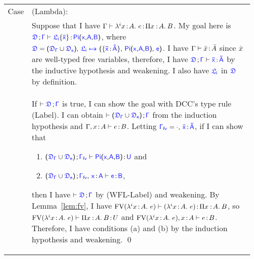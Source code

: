 \begin{theorem}
\begin{longtable}{p{0.05\linewidth} p{0.95\linewidth}}
Case & (Lambda):\\
& Suppose that I have $\Gamma \vdash \lambda^{i}x\hspace{0.5mm}{:}\hspace{0.5mm} A.\ e \hspace{0.5mm}{:}\hspace{0.5mm} \Pi x\mkern1.5mu{\hspace{0.5mm}{:}\hspace{0.5mm}} A.\hspace{0.8mm}B$.
My goal here is $\targetcon \vdash \targetlab{\flabel_i}{\bar{x}} \goodcolon \targetpi{x}{A}{B}$, where 
$\target{\fdef} = \sfpl \target{\fdef_{\Gamma}} \cup \target{\fdef_e}\sfpr \sfcomma 
\itemdef{\target{\flabel_i}}{\itemtype{\bar{x}}{\bar{A}}}{\targetpi{x}{A}{B}}{\target{e}}$. I have
$\Gamma \vdash \bar{x} \hspace{0.5mm}{:}\hspace{0.5mm} \bar{A}$ since $\bar{x}$ are well-typed free variables, therefore, I have 
$\targetcon \vdash \itemtype{\bar{x}}{\bar{A}}$ by the inductive hypothesis and weakening. I also have $\target{\flabel_i}$ in $\target{\fdef}$ by definition.\\
& If $\vdash \targetcon$ is true, I can show the goal with DCC's type rule (Label). I can obtain $\vdash \sfpl \target{\fdef_{\Gamma}} \cup \target{\fdef_e}\sfpr \semicolon \target{\Gamma}$ from the induction hypothesis and $\Gamma, x \hspace{0.5mm}{:}\hspace{0.5mm} A \vdash e \hspace{0.5mm}{:}\hspace{0.5mm} B$. Letting 
$\target{\Gamma_{fv}} = \target{\cdot}\sfcomma\itemtype{\bar{x}}{\bar{A}}$, if I can show that 
\begin{enumerate}[label=(\alph*)]
\item $\sfpl \target{\fdef_{\Gamma}} \cup \target{\fdef_e}\sfpr \semicolon \target{\Gamma_{fv}} \vdash \targetpi{x}{A}{B} \goodcolon \target{U} $ and 
\item $\sfpl \target{\fdef_{\Gamma}} \cup \target{\fdef_e}\sfpr \semicolon \target{\Gamma_{fv}} \sfcomma \itemtype{x}{A} \vdash \target{e} \goodcolon \target{B} $,
\end{enumerate}
then I have $\vdash \targetcon$ by (WFL-Label) and weakening. By Lemma~\ref{lem:fv}, I have $\text{FV}(\lambda^{i}x\hspace{0.5mm}{:}\hspace{0.5mm} A.\ e) \vdash (\lambda^{i}x\hspace{0.5mm}{:}\hspace{0.5mm} A.\ e) \hspace{0.5mm}{:}\hspace{0.5mm} \Pi x\mkern1.5mu{\hspace{0.5mm}{:}\hspace{0.5mm}} A.\hspace{0.8mm}B$, so $\text{FV}(\lambda^{i}x\hspace{0.5mm}{:}\hspace{0.5mm} A.\ e) \vdash \Pi x\mkern1.5mu{\hspace{0.5mm}{:}\hspace{0.5mm}} A.\hspace{0.8mm}B \hspace{0.5mm}{:}\hspace{0.5mm} U$ and
$\text{FV}(\lambda^{i}x\hspace{0.5mm}{:}\hspace{0.5mm} A.\ e), x \hspace{0.5mm}{:}\hspace{0.5mm} A \vdash e \hspace{0.5mm}{:}\hspace{0.5mm} B$. Therefore, I have conditions (a) and (b) by the induction hypothesis and weakening. \qed
\end{longtable}
\end{theorem}